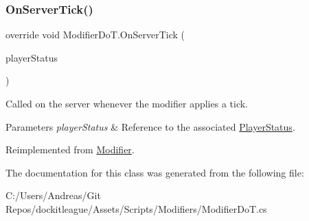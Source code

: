 \subsubsection{\texorpdfstring{On\+Server\+Tick()}{OnServerTick()}}
{\footnotesize\ttfamily override void Modifier\+Do\+T.\+On\+Server\+Tick (\begin{DoxyParamCaption}\item[{\hyperlink{class_player_status}{Player\+Status}}]{player\+Status }\end{DoxyParamCaption})\hspace{0.3cm}{\ttfamily [virtual]}}



Called on the server whenever the modifier applies a tick. 


\begin{DoxyParams}{Parameters}
{\em player\+Status} & Reference to the associated \hyperlink{class_player_status}{Player\+Status}.\\
\hline
\end{DoxyParams}


Reimplemented from \hyperlink{class_modifier_ac084768937c10fbcc456c37ec9f634fb}{Modifier}.



The documentation for this class was generated from the following file\+:\begin{DoxyCompactItemize}
\item 
C\+:/\+Users/\+Andreas/\+Git Repos/dockitleague/\+Assets/\+Scripts/\+Modifiers/Modifier\+Do\+T.\+cs\end{DoxyCompactItemize}
